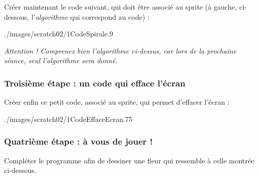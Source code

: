 
Créer maintenant le code suivant, qui doit être associé au sprite (à gauche, ci-dessous, l'\emph{algorithme} qui correspond au code) :

% 
              {./images/scratch02/1CodeSpirale}{.9\textwidth}  

\emph{Attention ! Comprenez bien l'algorithme ci-dessus, car lors de la prochaine séance, seul l'algorithme sera donné.} 

\subsubsection{Troisième étape : un code qui efface l'écran}

Créer enfin ce petit code, associé au sprite, qui permet d'effacer l'écran :

%
              {./images/scratch02/1CodeEffaceEcran}{.75\textwidth}


\subsubsection{Quatrième étape : à vous de jouer !}

Compléter le programme afin de dessiner une fleur qui ressemble à celle montrée ci-dessous.








